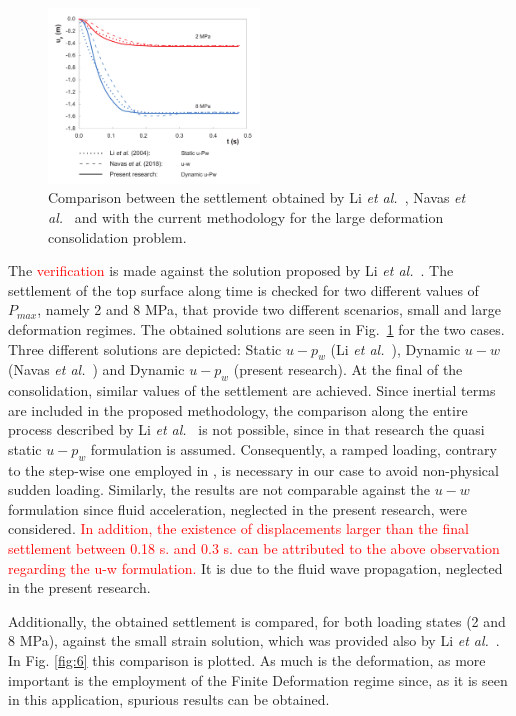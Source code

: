 \documentclass[twocolumn]{svjour3}          %
\begin{document}
\begin{figure}
  \includegraphics[width=0.5\textwidth]{Fig/borja.pdf}
\caption{Comparison between the settlement obtained by Li \textit{et al.}~\cite{LiBorja2004}, Navas \textit{et al.}~\cite{Navas:17b} and with the current methodology for the large deformation consolidation problem.}
\label{fig:5}      
\end{figure}
The \textcolor{red}{verification} is made against the solution proposed by Li \textit{et al.}~\cite{LiBorja2004}. The settlement of the top surface along time is checked for two different values of $P_{max}$, namely 2 and 8 MPa, that provide two different scenarios, small and large deformation regimes. The obtained solutions are seen in Fig.~\ref{fig:5} for the two cases. Three different solutions are depicted: Static $u-p_w$ (Li \textit{et al.}~\cite{LiBorja2004}), Dynamic $u-w$ (Navas \textit{et al.}~\cite{Navas:17b}) and Dynamic $u-p_w$ (present research). At the final of the consolidation, similar values of the settlement are achieved. Since inertial terms are included in the proposed methodology, the comparison along the entire process described by Li \textit{et al.}~\cite{LiBorja2004} is not possible, since in that research the quasi static $u-p_w$ formulation is assumed. Consequently, a ramped loading, contrary to the step-wise one employed in \cite{LiBorja2004}, is necessary in our case  to avoid non-physical sudden loading. Similarly, the results are not comparable against the $u-w$ formulation since fluid acceleration, neglected in the present research, were considered.  \textcolor{red}{In addition, the existence of displacements larger than the final settlement between 0.18 s. and 0.3 s. can be attributed to the above observation regarding the u-w formulation.} It is due to the fluid wave propagation, neglected in the present research.

Additionally, the obtained settlement is compared, for both loading states (2 and 8 MPa),  against the small strain solution, which was provided also by Li \textit{et al.}~\cite{LiBorja2004}. In Fig. \ref{fig:6} this comparison is plotted. As much is the deformation, as more important is the employment of the Finite Deformation regime since, as it is seen in this application, spurious results can be obtained.
\end{document}
